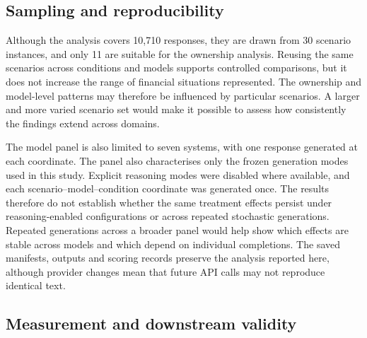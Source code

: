 \documentclass[12pt,a4paper,oneside]{report}
\newcommand{\rev}[1]{#1}
\newenvironment{revisionblock}{}{}
\begin{document}
\subsection[Sampling and reproducibility]{\rev{Sampling and reproducibility}}

\begin{revisionblock}
Although the analysis covers 10,710 responses, they are drawn from 30 scenario instances, and only 11 are suitable for the ownership analysis. Reusing the same scenarios across conditions and models supports controlled comparisons, but it does not increase the range of financial situations represented. The ownership and model-level patterns may therefore be influenced by particular scenarios. A larger and more varied scenario set would make it possible to assess how consistently the findings extend across domains.

The model panel is also limited to seven systems, with one response generated at each coordinate. The panel also characterises only the frozen generation modes used in this
study. Explicit reasoning modes were disabled where available, and each
scenario--model--condition coordinate was generated once. The results
therefore do not establish whether the same treatment effects persist under
reasoning-enabled configurations or across repeated stochastic generations. Repeated generations across a broader panel would help show which effects are stable across models and which depend on individual completions. The saved manifests, outputs and scoring records preserve the analysis reported here, although provider changes mean that future API calls may not reproduce identical text.
\end{revisionblock}

\subsection[Measurement and downstream validity]{\rev{Measurement and downstream validity}}
\end{document}
